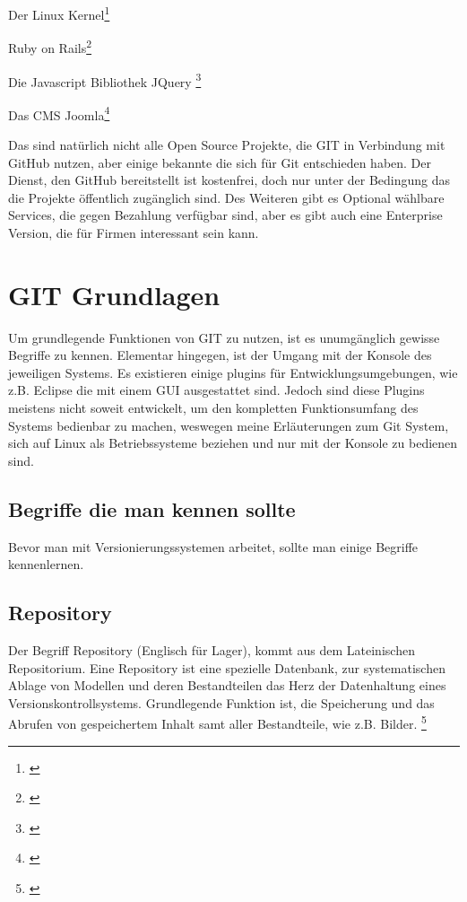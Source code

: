 \documentclass[12pt,a4paper,bibliography=totocnumbered,listof=totocnumbered]{scrartcl}
\begin{document}
\begin{compactitem}
	\item Der Linux Kernel\footnote{\cite{linux}}
	\item Ruby on Rails\footnote{\cite{ruby}}
	\item Die Javascript Bibliothek JQuery \footnote{\cite{jquery}}
	\item Das CMS Joomla\footnote{\cite{joomla}}
\end{compactitem}

Das sind natürlich nicht alle Open Source Projekte, die GIT in Verbindung mit GitHub nutzen, aber einige bekannte die sich für Git entschieden haben. Der Dienst, den GitHub bereitstellt ist kostenfrei, doch nur unter der Bedingung das die Projekte öffentlich zugänglich sind. Des Weiteren gibt es Optional wählbare Services, die gegen Bezahlung verfügbar sind, aber es gibt auch eine Enterprise Version, die für Firmen interessant sein kann.    
\pagebreak

\section{GIT Grundlagen}
Um grundlegende Funktionen von GIT zu nutzen, ist es unumgänglich gewisse Begriffe zu kennen. Elementar hingegen, ist der Umgang mit der Konsole des jeweiligen Systems. Es existieren einige plugins für Entwicklungsumgebungen, wie z.B. Eclipse die mit einem GUI ausgestattet sind. Jedoch sind diese Plugins meistens nicht soweit entwickelt, um den kompletten Funktionsumfang des Systems bedienbar zu machen,
weswegen meine Erläuterungen zum Git System, sich auf Linux als Betriebssysteme beziehen und nur mit der Konsole zu bedienen sind.     

\subsection{Begriffe die man kennen sollte}
Bevor man mit Versionierungssystemen arbeitet, sollte man einige Begriffe kennenlernen. 
\subsection{Repository}
Der Begriff Repository (Englisch für Lager), kommt aus dem Lateinischen Repositorium.
Eine Repository ist eine spezielle Datenbank, zur systematischen Ablage von Modellen und deren Bestandteilen das Herz der Datenhaltung eines Versionskontrollsystems. Grundlegende Funktion ist, die Speicherung und das Abrufen von gespeichertem Inhalt samt aller Bestandteile, wie z.B. Bilder. \footnote{\cite{Leymann}} 
\end{document}
